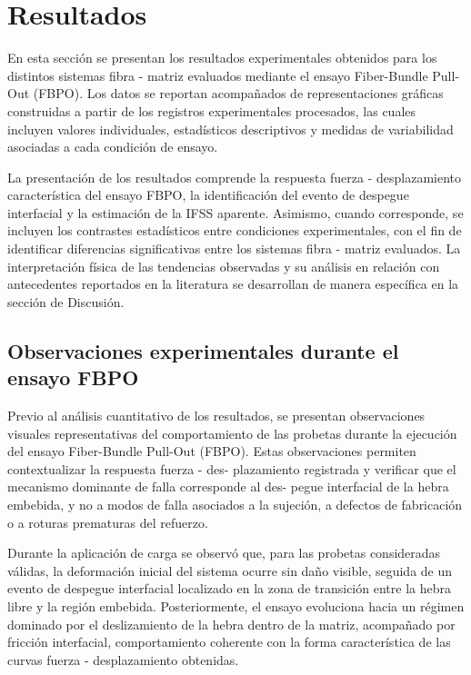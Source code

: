 
\section{Resultados}

En esta sección se presentan los resultados experimentales obtenidos para los distintos sistemas
fibra - matriz evaluados mediante el ensayo Fiber-Bundle Pull-Out (FBPO). Los datos se reportan
acompañados de representaciones gráficas construidas a partir de
los registros experimentales procesados, las cuales incluyen valores individuales, estadísticos
descriptivos y medidas de variabilidad asociadas a cada condición de ensayo.

La presentación de los resultados comprende la respuesta fuerza - desplazamiento característica
del ensayo FBPO, la identificación del evento de despegue interfacial y la estimación de la IFSS
aparente. Asimismo, cuando corresponde, se incluyen los contrastes estadísticos entre condiciones
experimentales, con el fin de identificar diferencias significativas entre los sistemas
fibra - matriz evaluados. La interpretación física de las tendencias observadas y su análisis en
relación con antecedentes reportados en la literatura se desarrollan de manera específica en la
sección de Discusión.

\subsection{Observaciones experimentales durante el ensayo FBPO}

Previo al análisis cuantitativo de los resultados, se presentan observaciones visuales
representativas del comportamiento de las probetas durante la ejecución del ensayo
Fiber-Bundle Pull-Out (FBPO). Estas observaciones permiten contextualizar la respuesta
fuerza - des- plazamiento registrada y verificar que el mecanismo dominante de falla
corresponde al des- pegue interfacial de la hebra embebida, y no a modos de falla
asociados a la sujeción, a defectos de fabricación o a roturas prematuras del refuerzo.

Durante la aplicación de carga se observó que, para las probetas consideradas válidas,
la deformación inicial del sistema ocurre sin daño visible, seguida de un evento de
despegue interfacial localizado en la zona de transición entre la hebra libre y la región
embebida. Posteriormente, el ensayo evoluciona hacia un régimen dominado por el
deslizamiento de la hebra dentro de la matriz, acompañado por fricción interfacial,
comportamiento coherente con la forma característica de las curvas
fuerza - desplazamiento obtenidas.

